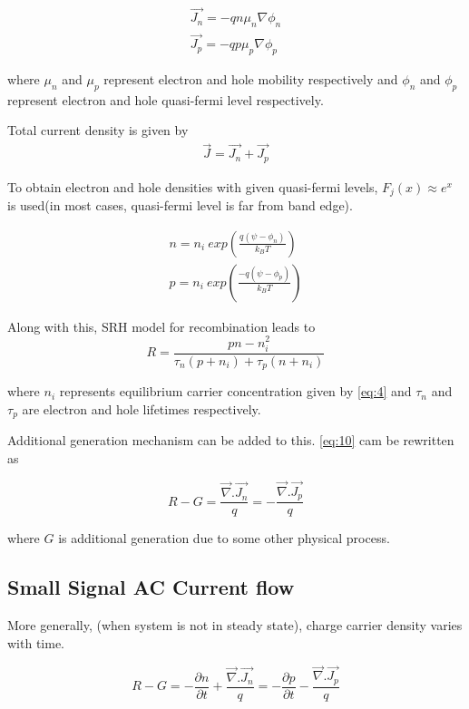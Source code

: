 \begin{align*}
\vec{J_n} = -qn\mu_n\nabla\phi_n \\ 
\vec{J_p} = -qp\mu_p\nabla\phi_p  \tag{1.11} \label{eq:11}
\end{align*}

where $\mu_n$ and $\mu_p$ represent electron and hole mobility respectively and $\phi_n$ and $\phi_p$ represent electron and hole quasi-fermi level respectively.

Total current density is given by
\begin{align*}
\vec{J} = \vec{J_n} + \vec{J_p}
\end{align*}

To obtain electron and hole densities with given quasi-fermi levels, $F_j(x) \approx e^x$ is used(in most cases, quasi-fermi level is far from band edge). 

\begin{align*}
n = n_i\ exp({\frac{q(\psi-\phi_n)}{k_BT}}) \\
p = n_i\ exp({\frac{-q(\psi-\phi_p)}{k_BT}}) \tag{1.12} \label{eq:12}
\end{align*}

Along with this, SRH model for recombination leads to
\begin{equation}
R = \frac{pn - n_i^2}{\tau_n(p + n_i) + \tau_p(n + n_i)} \tag{1.13}\label{eq:13}
\end{equation}

where $n_i$ represents equilibrium carrier concentration given by \eqref{eq:4} and $\tau_n$ and $\tau_p$ are electron and hole lifetimes respectively.

Additional generation mechanism can be added to this.   
\eqref{eq:10} cam be rewritten as 

\begin{equation}
R - G =  \frac{\vec{\nabla}.\vec{J_n}}{q} =-\frac{\vec{\nabla}.\vec{J_p}}{q}   \tag{1.14} \label{eq:38}
\end{equation}

where $G$ is additional generation due to some other physical process.

\subsection{Small Signal AC Current flow}
More generally, (when system is not in steady state), charge carrier density varies with time.

\begin{equation}
R - G = -\frac{\partial{n}}{\partial t} + \frac{\vec{\nabla}.\vec{J_n}}{q} = -\frac{\partial{p}}{\partial t} -\frac{\vec{\nabla}.\vec{J_p}}{q}   \tag{1.15} \label{eq:39}
\end{equation}

